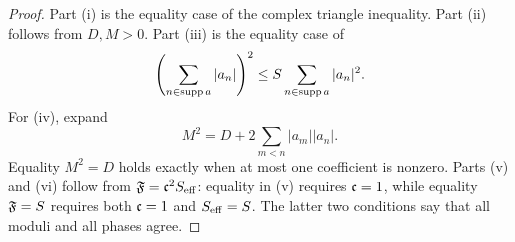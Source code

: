 \begin{proof}
Part (i) is the equality case of the complex triangle inequality.
Part (ii) follows from \(D,M>0\).  Part (iii) is the equality case of
\[
 \left(\sum_{n\in\operatorname{supp} a}|a_n|\right)^2
 \le S\sum_{n\in\operatorname{supp} a}|a_n|^2.
\]
For (iv), expand
\[
 M^2
 =D+2\sum_{m<n}|a_m||a_n|.
\]
Equality \(M^2=D\) holds exactly when at most one coefficient is
nonzero.  Parts (v) and (vi) follow from
\(\mathfrak F=\mathfrak c^2S_{\mathrm{eff}}\): equality in (v) requires
\(\mathfrak c=1\), while equality \(\mathfrak F=S\) requires both
\(\mathfrak c=1\) and \(S_{\mathrm{eff}}=S\).  The latter two conditions say that
all moduli and all phases agree.
\end{proof}
